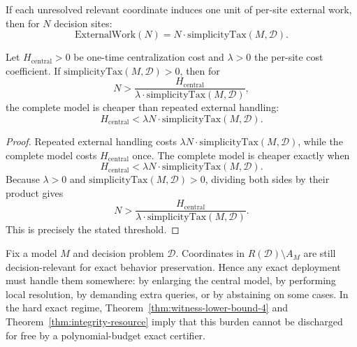 \begin{proposition}
If each unresolved relevant coordinate induces one unit of per-site external work, then for $N$ decision sites:
\[
\mathrm{ExternalWork}(N) = N \cdot \mathrm{simplicityTax}(M,\mathcal{D}).
\]
\end{proposition}

\begin{theorem}
Let $H_{\mathrm{central}}>0$ be one-time centralization cost and $\lambda>0$ the per-site cost coefficient. If $\mathrm{simplicityTax}(M,\mathcal{D})>0$, then for
\[
N > \frac{H_{\mathrm{central}}}{\lambda \cdot \mathrm{simplicityTax}(M,\mathcal{D})},
\]
the complete model is cheaper than repeated external handling:
\[
H_{\mathrm{central}} < \lambda N\cdot \mathrm{simplicityTax}(M,\mathcal{D}).
\]
\end{theorem}

\begin{proof}
Repeated external handling costs $\lambda N\cdot \mathrm{simplicityTax}(M,\mathcal{D})$, while the complete model costs $H_{\mathrm{central}}$ once. The complete model is cheaper exactly when
\[
H_{\mathrm{central}} < \lambda N\cdot \mathrm{simplicityTax}(M,\mathcal{D}).
\]
Because $\lambda>0$ and $\mathrm{simplicityTax}(M,\mathcal{D})>0$, dividing both sides by their product gives
\[
N > \frac{H_{\mathrm{central}}}{\lambda \cdot \mathrm{simplicityTax}(M,\mathcal{D})}.
\]
This is precisely the stated threshold.
\end{proof}

\begin{corollary}
Fix a model $M$ and decision problem $\mathcal{D}$. Coordinates in $R(\mathcal{D})\setminus A_M$ are still decision-relevant for exact behavior preservation. Hence any exact deployment must handle them somewhere: by enlarging the central model, by performing local resolution, by demanding extra queries, or by abstaining on some cases. In the hard exact regime, Theorem~\ref{thm:witness-lower-bound-4} and Theorem~\ref{thm:integrity-resource} imply that this burden cannot be discharged for free by a polynomial-budget exact certifier.
\end{corollary}

